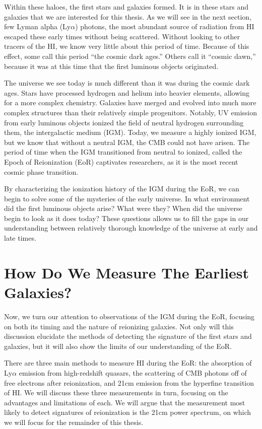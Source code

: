 Within these haloes, the first stars and galaxies formed. It is in these stars and galaxies that we
are interested for this thesis. As we will see in the next section, few Lyman alpha
(Ly$\alpha$) photons, the most 
abundant source of radiation from HI escaped these early times without being scattered. Without
looking to other tracers of the HI, we know very little about this period of time. Because of this effect, some call
this period ``the cosmic dark ages.'' Others call it ``cosmic dawn,'' because it was at this time
that the first luminous objects originated.

The universe we see today is much different than it was during the cosmic dark ages. Stars have processed
hydrogen and helium into heavier elements, allowing for a more complex chemistry. Galaxies have
merged and evolved into much more complex structures than their relatively simple progenitors.
Notably, UV emission from early luminous objects ionized the field of neutral hydrogen
surrounding them, the intergalactic medium
(IGM). Today,
we measure a highly ionized IGM, but we know that without a neutral IGM, the CMB could not have
arisen. The period of time when the IGM transitioned from neutral to ionized, called the Epoch of
Reionization (EoR) captivates researchers, as it is the
most recent cosmic phase transition.

By characterizing the ionization history of the IGM during the EoR, we can begin to solve some of 
the mysteries of the early universe. In what environment did the first luminous objects arise? What 
were they? When did the universe begin to look as it does today? These questions allows us to fill
the gaps in our understanding between relatively thorough knowledge of the universe at early and
late times.

\section{How Do We Measure The Earliest Galaxies?}

Now, we turn our attention to observations of the IGM during the EoR, focusing on both its timing
and the nature of reionizing galaxies. Not only will this discussion elucidate the methods of
detecting the signature of the first stars and galaxies, but it will also show the limits of our
understanding of the EoR.

There are three main methods to measure HI during the EoR: the absorption of Ly$\alpha$
emission from high-redshift quasars, the scattering of CMB photons off of free electrons after
reionization, and 21cm emission from the hyperfine transition of HI. We will discuss
these three measurements in turn, focusing on the advantages and limitations of 
each. We will argue that the measurement most likely to detect signatures of reionization is the
21cm power spectrum, on which we will focus for the remainder of this thesis.

